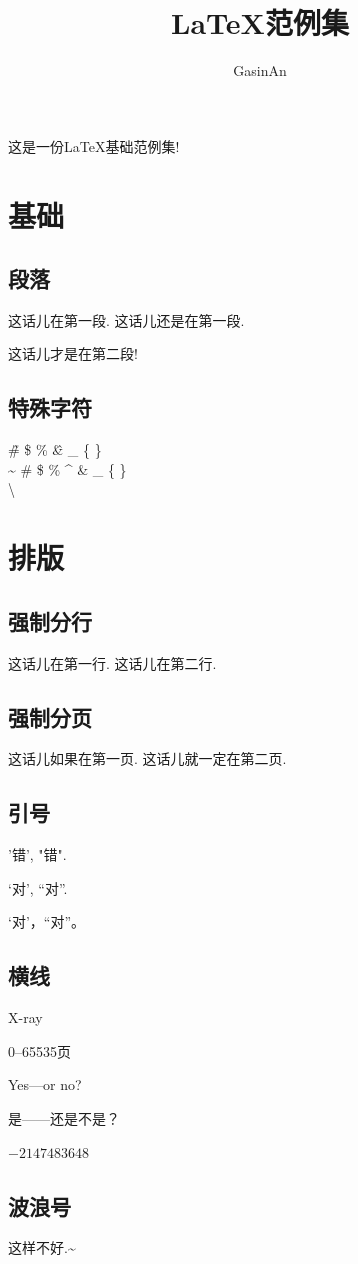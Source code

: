 \documentclass{ctexart}
\title{\LaTeX{}范例集}
\author{GasinAn}
\begin{document}
    \maketitle
    这是一份\LaTeX{}基础范例集!
    \section{基础}
    \subsection{段落}
    这话儿在第一段.
    这话儿还是在第一段.

    这话儿才是在第二段!
    \subsection{特殊字符}
    \~ \# \$ \% \^ \& \_ \{ \} \\ %
    \~{} \# \$ \% \^{} \& \_ \{ \} \\ \textbackslash %
    \section{排版}
    \subsection{强制分行}
    这话儿在第一行.\newline
    这话儿在第二行.
    \subsection{强制分页}
    这话儿如果在第一页.\newpage
    这话儿就一定在第二页.
    \subsection{引号}
    '错', "错".

    `对', ``对''.

    ‘对’，“对”。
    \subsection{横线}
    X-ray

    0--65535页

    Yes---or no?

    是——还是不是？

    $-2147483648$
    \subsection{波浪号}
    这样不好.\~{}
\end{document}
